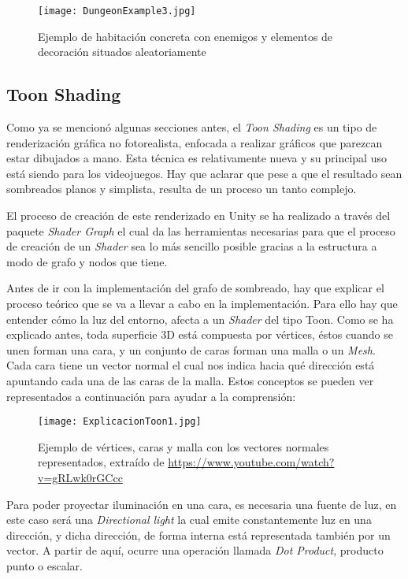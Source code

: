 \begin{figure}[H]
    \centering
    \texttt{[image: DungeonExample3.jpg]}
    \caption{Ejemplo de habitación concreta con enemigos y elementos de decoración situados aleatoriamente}
\end{figure}

\subsection{Toon Shading}

Como ya se mencionó algunas secciones antes, el \textit{Toon Shading} es un tipo de renderización gráfica no fotorealista, enfocada a realizar gráficos que parezcan estar dibujados a mano. Esta técnica es relativamente nueva y su principal uso está siendo para los videojuegos. Hay que aclarar que pese a que el resultado sean sombreados planos y simplista, resulta de un proceso un tanto complejo.

El proceso de creación de este renderizado en Unity se ha realizado a través del paquete \textit{Shader Graph} el cual da las herramientas necesarias para que el proceso de creación de un \textit{Shader} sea lo más sencillo posible gracias a la estructura a modo de grafo y nodos que tiene.

Antes de ir con la implementación del grafo de sombreado, hay que explicar el proceso teórico que se va a llevar a cabo en la implementación. Para ello hay que entender cómo la luz del entorno, afecta a un \textit{Shader} del tipo Toon. Como se ha explicado antes, toda superficie 3D está compuesta por vértices, éstos cuando se unen forman una cara, y un conjunto de caras forman una malla o un \textit{Mesh}. Cada cara tiene un vector normal el cual nos indica hacia qué dirección está apuntando cada una de las caras de la malla. Estos conceptos se pueden ver representados a continuación para ayudar a la comprensión: 

\begin{figure}[H]
    \centering
    \texttt{[image: ExplicacionToon1.jpg]}
    \caption{Ejemplo de vértices, caras y malla con los vectores normales representados, extraído de \url{https://www.youtube.com/watch?v=gRLwk0rGCcc}}
\end{figure}

Para poder proyectar iluminación en una cara, es necesaria una fuente de luz, en este caso será una \textit{Directional light} la cual emite constantemente luz en una dirección, y dicha dirección, de forma interna está representada también por un vector. A partir de aquí, ocurre una operación llamada \textit{Dot Product}, producto punto o escalar.

